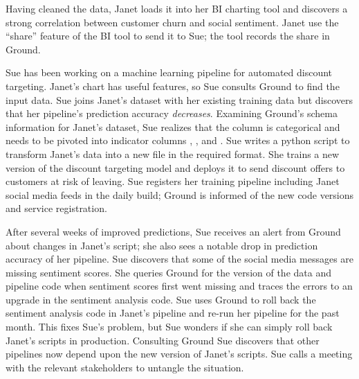 \documentclass{sig-alternate}
\begin{document}
Having cleaned the data, Janet loads it into her BI charting tool and discovers a strong correlation between customer churn and social sentiment. 
Janet use the ``share'' feature of the BI tool to send it to Sue; the tool records the share in Ground.


Sue has been working on a machine learning pipeline for automated discount targeting. Janet's chart has useful features, so Sue consults Ground to find the input data.
Sue joins Janet's dataset with her existing training data but discovers that her pipeline's prediction accuracy \emph{decreases}.  
Examining Ground's schema information for Janet's dataset, Sue realizes that the  column is categorical and needs to be pivoted into indicator columns , , and . 
Sue writes a python script to transform Janet's data into a new file in the required format.
She trains a new version of the discount targeting model and deploys it to send discount offers to customers at risk of leaving.
Sue registers her training pipeline including Janet social media feeds in the daily build; Ground is informed of the new code versions and service registration.

After several weeks of improved predictions, Sue receives an alert from Ground about changes in Janet's script; she also sees a notable drop in prediction accuracy of her pipeline. 
Sue discovers that some of the social media messages are missing sentiment scores.
She queries Ground for the version of the data and pipeline code when sentiment scores first went missing and traces the errors to an upgrade in the sentiment analysis code.
Sue uses Ground to roll back the sentiment analysis code in Janet's pipeline and re-run her pipeline for the past month.  
This fixes Sue's problem, but Sue wonders if she can simply roll back Janet's scripts in production. 
Consulting Ground Sue discovers that other pipelines now depend upon the new version of Janet's scripts.
Sue calls a meeting with the relevant stakeholders to untangle the situation.


\end{document}
